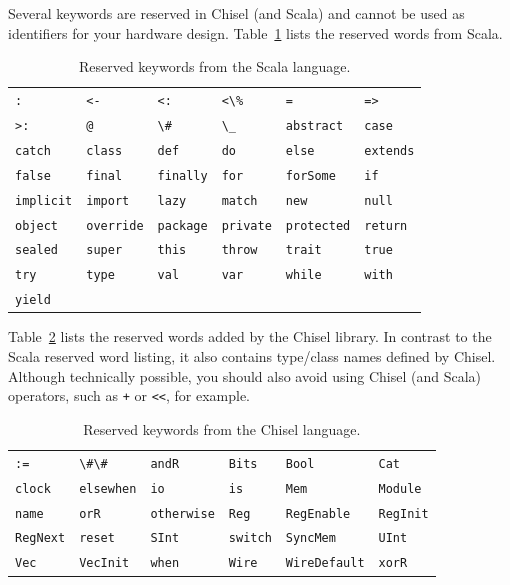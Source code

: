 \documentclass[%
    10pt,
    headinclude, footexclude,
    openright, %
    notitlepage,
    cleardoubleempty,
    headsepline,
    pointlessnumbers,
    bibtotoc, idxtotoc,
    ]{scrbook}
\newcommand{\code}[1]{{\lstinline[basicstyle=\small\ttfamily]{#1}}}
\begin{document}
Several keywords are reserved in Chisel (and Scala) and cannot be used as identifiers
for your hardware design.
Table~\ref{tab:reserved:scala} lists the reserved words from Scala.

\begin{table}[h]
\centering
\begin{tabular}{llllll}
\code{:}  & \code{<-}  & \code{<:}  & \code{<\%}  & \code{=}  & \code{=>} \\
\code{>:}  & \code{@}  & \code{\#}  & \code{\_}  & \code{abstract}  & \code{case} \\
\code{catch}  & \code{class}  & \code{def}  & \code{do}  & \code{else}  & \code{extends} \\
\code{false}  & \code{final}  & \code{finally}  & \code{for}  & \code{forSome}  & \code{if} \\
\code{implicit}  & \code{import}  & \code{lazy}  & \code{match}  & \code{new}  & \code{null} \\
\code{object}  & \code{override}  & \code{package}  & \code{private}  & \code{protected}  & \code{return} \\
\code{sealed}  & \code{super}  & \code{this}  & \code{throw}  & \code{trait}  & \code{true} \\
\code{try}  & \code{type}  & \code{val}  & \code{var}  & \code{while}  & \code{with} \\
\code{yield}  & \\
\end{tabular}
\caption{Reserved keywords from the Scala language.}
\label{tab:reserved:scala}
\end{table}

Table~\ref{tab:reserved:chisel} lists the reserved words added by the Chisel library.
In contrast to the Scala reserved word listing, it also contains type/class names defined by Chisel.
Although technically possible, you should also avoid using Chisel (and Scala) operators, such as
\code{+} or \code{<<}, for example. %

\begin{table}[h]
\centering
\begin{tabular}{llllll}
\code{:=}  & \code{\#\#}  & \code{andR}  & \code{Bits}  & \code{Bool}  & \code{Cat} \\
\code{clock}  & \code{elsewhen}  & \code{io}  & \code{is}  & \code{Mem}  & \code{Module} \\
\code{name}  & \code{orR}  & \code{otherwise}  & \code{Reg}  & \code{RegEnable}  & \code{RegInit} \\
\code{RegNext}  & \code{reset}  & \code{SInt}  & \code{switch}  & \code{SyncMem}  & \code{UInt} \\
\code{Vec}  & \code{VecInit}  & \code{when}  & \code{Wire}  & \code{WireDefault}  & \code{xorR} \\
\end{tabular}
\caption{Reserved keywords from the Chisel language.}
\label{tab:reserved:chisel}
\end{table}
\end{document}
